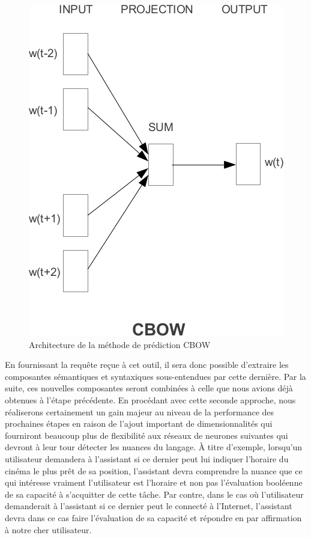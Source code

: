 \documentclass[11pt]{article}
\begin{document}
\begin{figure}[ht]
  \centering
  \includegraphics[width=\columnwidth]{cbow}
  \caption{Architecture de la méthode de prédiction CBOW}
  \label{fig:cbow}
\end{figure}

En fournissant la requête reçue à cet outil, il sera donc possible d'extraire les composantes sémantiques et syntaxiques sous-entendues par cette dernière. Par la suite, ces nouvelles composantes seront combinées à celle que nous avions déjà obtenues à l'étape précédente. En procédant avec cette seconde approche, nous réaliserons certainement un gain majeur au niveau de la performance des prochaines étapes en raison de l'ajout important de dimensionnalités qui fourniront beaucoup plus de flexibilité aux réseaux de neurones suivantes qui devront à leur tour détecter les nuances du langage. À titre d'exemple, lorsqu'un utilisateur demandera à l'assistant si ce dernier peut lui indiquer l'horaire du cinéma le plus prêt de sa position, l'assistant devra comprendre la nuance que ce qui intéresse vraiment l'utilisateur est l'horaire et non pas l'évaluation booléenne de sa capacité à s'acquitter de cette tâche. Par contre, dans le cas où l'utilisateur demanderait à l'assistant si ce dernier peut le connecté à l'Internet, l'assistant devra dans ce cas faire l'évaluation de sa capacité et répondre en par affirmation à notre cher utilisateur. \\
\end{document}
